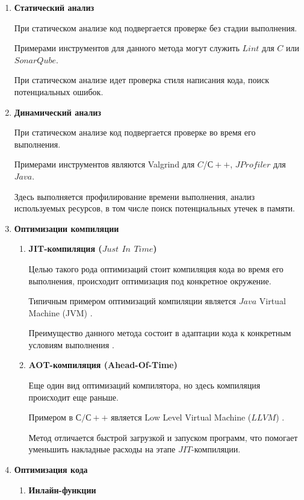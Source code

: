 \documentclass{mipt-thesis-bs}
\begin{document}
\begin{enumerate}
\item \textbf{Статический анализ}

При статическом анализе код подвергается проверке без стадии выполнения.

Примерами инструментов для данного метода могут служить $Lint$ для $C$ или $SonarQube$.

При статическом анализе идет проверка стиля написания кода, поиск потенциальных ошибок.

\item \textbf{Динамический анализ}

При статическом анализе код подвергается проверке во время его выполнения.

Примерами инструментов являются Valgrind для $C$/$С++$, $JProfiler$ для $Java$.

Здесь выполняется профилирование времени выполнения, анализ используемых ресурсов, в том числе
поиск потенциальных утечек в памяти.

\item \textbf{Оптимизации компиляции}
    \begin{enumerate}
        \item \textbf{JIT-компиляция ($Just$ $In$ $Time$)}

        Целью такого рода оптимизаций стоит компиляция кода во время его выполнения, происходит
        оптимизация под конкретное окружение.

        Типичным примером оптимизаций компиляции является $Java$ Virtual Machine (JVM) \cite{jvm-spec}.

        Преимущество данного метода состоит в адаптации кода к конкретным условиям выполнения \cite{jvm-spec}.

        \item \textbf{AOT-компиляция (Ahead-Of-Time)}

        Еще один вид оптимизаций компилятора, но здесь компиляция происходит еще раньше.

        Примером в $С/С++$ является Low Level Virtual Machine ($LLVM$) \cite{clang-tidy}.

        Метод отличается быстрой загрузкой и запуском программ, что помогает уменьшить накладные
        расходы на этапе $JIT$-компиляции.
    \end{enumerate}

\item \textbf{Оптимизация кода}
    \begin{enumerate}
        \item \textbf{Инлайн-функции}


\end{enumerate}
\end{enumerate}
\end{document}
